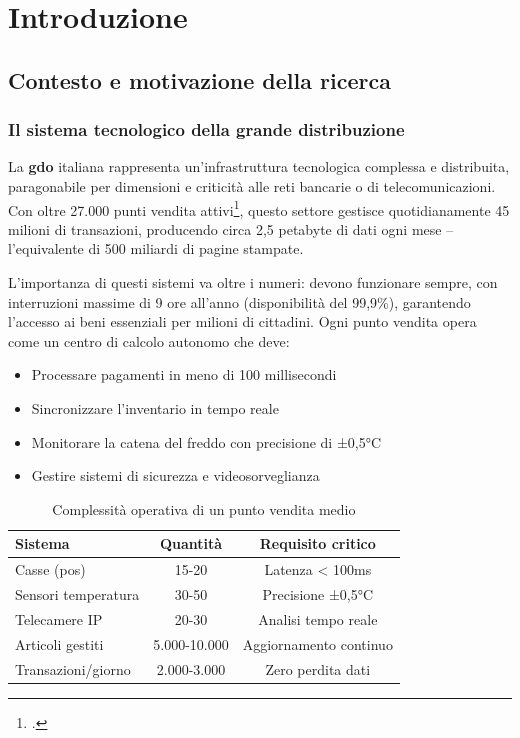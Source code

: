 \chapter{Introduzione}
\label{cap:introduzione}

\section{Contesto e motivazione della ricerca}
\label{sec:contesto_motivazione}

\subsection{Il sistema tecnologico della grande distribuzione}
\label{subsec:sistema_tecnologico}

La \textbf{\gls{gdo}} italiana rappresenta un'infrastruttura tecnologica complessa e distribuita, paragonabile per dimensioni e criticità alle reti bancarie o di telecomunicazioni. Con oltre 27.000 punti vendita attivi\footcite{istat2024}, questo settore gestisce quotidianamente 45 milioni di transazioni, producendo circa 2,5 petabyte di dati ogni mese – l'equivalente di 500 miliardi di pagine stampate.

L'importanza di questi sistemi va oltre i numeri: devono funzionare sempre, con interruzioni massime di 9 ore all'anno (disponibilità del 99,9\%), garantendo l'accesso ai beni essenziali per milioni di cittadini. Ogni punto vendita opera come un centro di calcolo autonomo che deve:

\begin{itemize}
\item Processare pagamenti in meno di 100 millisecondi
\item Sincronizzare l'inventario in tempo reale
\item Monitorare la catena del freddo con precisione di ±0,5°C
\item Gestire sistemi di sicurezza e videosorveglianza
\end{itemize}

\begin{table}[htbp]
\centering
\caption{Complessità operativa di un punto vendita medio}
\label{tab:complessita_pv}
\begin{tabular}{|l|c|c|}
\hline
\textbf{Sistema} & \textbf{Quantità} & \textbf{Requisito critico} \\
\hline
Casse (\gls{pos}) & 15-20 & Latenza < 100ms \\
Sensori temperatura & 30-50 & Precisione ±0,5°C \\
Telecamere IP & 20-30 & Analisi tempo reale \\
Articoli gestiti & 5.000-10.000 & Aggiornamento continuo \\
Transazioni/giorno & 2.000-3.000 & Zero perdita dati \\
\hline
\end{tabular}
\end{table}

